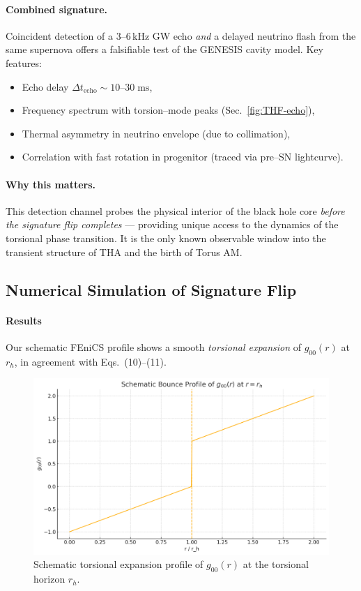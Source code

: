 \documentclass{article}
\begin{document}
\paragraph{Combined signature.}
Coincident detection of a 3--6\,kHz GW echo \emph{and} a delayed neutrino flash
from the same supernova offers a falsifiable test of the GENESIS cavity model.
Key features:

\begin{itemize}
\item Echo delay \(\Delta t_{\text{echo}} \sim 10\text{--}30\;\mathrm{ms}\),
\item Frequency spectrum with torsion--mode peaks (Sec.~\ref{fig:THF-echo}),
\item Thermal asymmetry in neutrino envelope (due to collimation),
\item Correlation with fast rotation in progenitor (traced via pre--SN lightcurve).
\end{itemize}

\paragraph{Why this matters.}
This detection channel probes the physical interior of the black hole core
\emph{before the signature flip completes} --- providing unique access to the dynamics
of the torsional phase transition. It is the only known observable window
into the transient structure of THA and the birth of Torus AM.



\subsection{Numerical Simulation of Signature Flip}
\label{sec:FEniCS-simulation}

\paragraph{Results}
Our schematic FEniCS profile shows a smooth \emph{torsional expansion} of \(g_{00}(r)\) at \(r_h\), in agreement with Eqs.~(10)–(11).

\begin{figure}[h]
  \centering
  \includegraphics[width=0.7\linewidth]{FEniCS_bounce.png}
  \caption{Schematic torsional expansion profile of \(g_{00}(r)\) at the torsional horizon \(r_h\).}
  \label{fig:FEniCS-bounce}
\end{figure}
\end{document}
